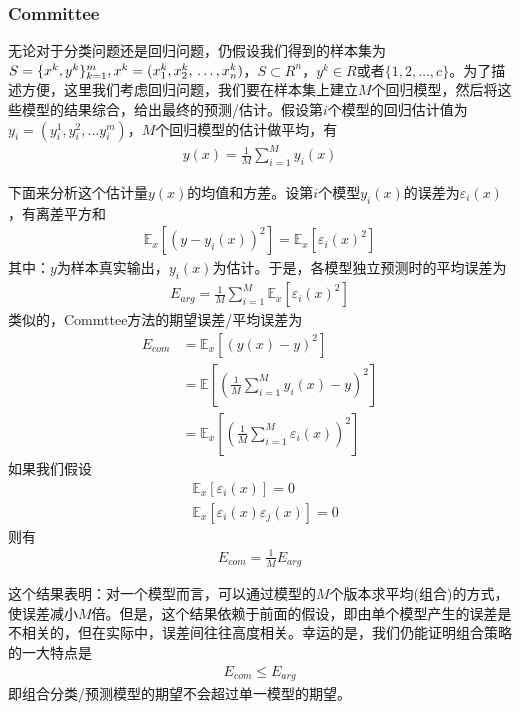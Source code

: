         \subsubsection{Committee}
            \par
            无论对于分类问题还是回归问题，仍假设我们得到的样本集为$S=\{x^k,y^k\}_{k=1}^m,x^k = (x_1^k,x_2^k,\\\dots,x_n^k)$，$S\subset R^n$，$y^k\in R$或者$\{1,2,\dots,c\}$。为了描述方便，这里我们考虑回归问题，我们要在样本集上建立$M$个回归模型，然后将这些模型的结果综合，给出最终的预测/估计。假设第$i$个模型的回归估计值为$y_i = (y_i^1,y_i^2,\dots y_i^m)$，$M$个回归模型的估计做平均，有
            \begin{align*}
            y(x) = \frac{1}{M} \sum_{i=1}^M y_i(x)
            \end{align*}
            \par
            下面来分析这个估计量$y(x)$的均值和方差。设第$i$个模型$y_i(x)$的误差为$\varepsilon_i(x)$，有离差平方和
            \begin{align*}
            \mathbb{E}_x[(y-y_i(x))^2] = \mathbb{E}_x[\varepsilon_i(x)^2]
            \end{align*}
            其中：$y$为样本真实输出，$y_i(x)$为估计。于是，各模型独立预测时的平均误差为
            \begin{align*}
            E_{arg} = \frac{1}{M} \sum_{i=1}^M \mathbb{E}_x[\varepsilon_i(x)^2]
            \end{align*}
            类似的，Commttee方法的期望误差/平均误差为
            \begin{align*}
            E_{com} &= \mathbb{E}_x[(y(x)-y)^2]\\
            &=\mathbb{E}\left[\left(\frac{1}{M}\sum_{i=1}^M y_i(x)-y\right)^2\right]\\
            &=\mathbb{E}_x\left[\left( \frac{1}{M} \sum_{i=1}^M \varepsilon_i(x) \right)^2   \right]
            \end{align*}
            如果我们假设
            \begin{align*}
            & \mathbb{E}_x[\varepsilon_i(x)] = 0\\
            & \mathbb{E}_x[\varepsilon_i(x)\varepsilon_j(x)] = 0
            \end{align*}
            则有
            \begin{align*}
            E_{com} = \frac{1}{M}E_{arg}
            \end{align*}
            \par
            这个结果表明：对一个模型而言，可以通过模型的$M$个版本求平均(组合)的方式，使误差减小$M$倍。但是，这个结果依赖于前面的假设，即由单个模型产生的误差是不相关的，但在实际中，误差间往往高度相关。幸运的是，我们仍能证明组合策略的一大特点是
            \begin{align*}
            E_{com} \leqslant E_{arg}
            \end{align*}
            即组合分类/预测模型的期望不会超过单一模型的期望。
